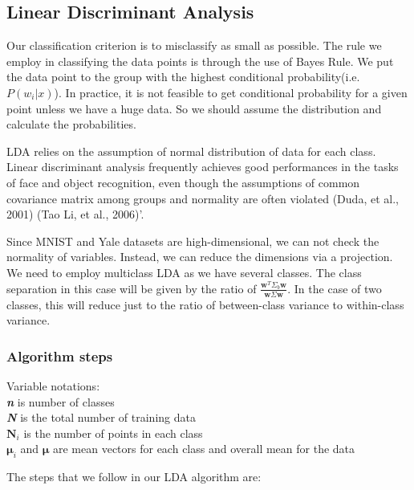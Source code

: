 \subsection{Linear Discriminant Analysis}

Our classification criterion is to misclassify as small as possible. The rule we employ in classifying the data points is through the use of Bayes Rule. We put the data point to the group with the highest conditional probability(i.e. $P(w_i|x)$). In practice, it is not feasible to get conditional probability for a given point unless we have a huge data. So we should assume the distribution and calculate the probabilities. 

LDA relies on the assumption of normal distribution of data for each class. Linear discriminant analysis frequently achieves good performances in the tasks of face and object recognition, even though the assumptions of common covariance matrix among groups and normality are often violated (Duda, et al., 2001) (Tao Li, et al., 2006)'.

Since MNIST and Yale datasets are high-dimensional, we can not check the normality of variables. Instead, we can reduce the dimensions via a projection.
We need to employ multiclass LDA as we have several classes. The class separation in this case will be given by the ratio of $\frac{\pmb w^T \Sigma_b \pmb w}{\pmb w \Sigma \pmb w}$. In the case of two classes, this will reduce just to the ratio of between-class variance to within-class variance.

\subsubsection{Algorithm steps}
Variable notations: \\
\textit{\textbf{n}} is number of classes \\ \textit{\textbf{N}} is the total number of training data\\ $\pmb N_i$ is the number of points in each class \\ $\pmb \mu_i$ and $\pmb \mu$ are mean vectors for each class and overall mean for the data

The steps that we follow in our LDA algorithm are:
 
